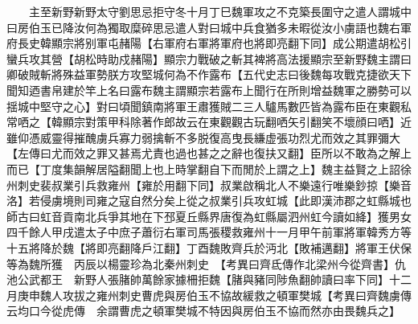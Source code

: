 　　主至新野新野太守劉思忌拒守冬十月丁巳魏軍攻之不克築長圍守之遣人謂城中曰房伯玉已降汝何為獨取糜碎思忌遣人對曰城中兵食猶多未暇從汝小虜語也魏右軍府長史韓顯宗將别軍屯赭陽【右軍府右軍將軍府也將即亮翻下同】成公期遣胡松引蠻兵攻其營【胡松時助戍赭陽】顯宗力戰破之斬其裨將高法援顯宗至新野魏主謂曰卿破賊斬將殊益軍勢朕方攻堅城何為不作露布【五代史志曰後魏每攻戰克捷欲天下聞知迺書帛建於竿上名曰露布魏主謂顯宗若露布上聞行在所則增益魏軍之勝勢可以揺城中堅守之心】對曰頃聞鎮南將軍王肅獲賊二三人驢馬數匹皆為露布臣在東觀私常哂之【韓顯宗對策甲科除著作郎故云在東觀觀古玩翻哂矢引翻笑不壞顔曰哂】近雖仰憑威靈得摧醜虜兵寡力弱擒斬不多脱復高曳長縑虚張功烈尤而效之其罪彌大【左傳曰尤而效之罪又甚焉尤責也過也甚之之辭也復扶又翻】臣所以不敢為之解上而已【丁度集韻解居隘翻聞上也上時掌翻自下而閒於上謂之上】魏主益賢之上詔徐州刺史裴叔業引兵救雍州【雍於用翻下同】叔業啟稱北人不樂遠行唯樂鈔掠【樂音洛】若侵虜境則司雍之寇自然分矣上從之叔業引兵攻虹城【此即漢沛郡之虹縣城也師古曰虹音貢南北兵爭其地在下邳夏丘縣界唐復為虹縣屬泗州虹今讀如絳】獲男女四千餘人甲戌遣太子中庶子蕭衍右軍司馬張稷救雍州十一月甲午前軍將軍韓秀方等十五將降於魏【將即亮翻降戶江翻】丁酉魏敗齊兵於沔北【敗補邁翻】將軍王伏保等為魏所獲　丙辰以楊靈珍為北秦州刺史　【考異曰齊氐傳作北梁州今從齊書】仇池公武都王　新野人張䐗帥萬餘家據柵拒魏【䐗與豬同陟魚翻帥讀曰率下同】十二月庚申魏人攻拔之雍州刺史曹虎與房伯玉不協故緩救之頓軍樊城【考異曰齊魏虜傳云均口今從虎傳　余謂曹虎之頓軍樊城不特因與房伯玉不協而然亦由畏魏兵之】

